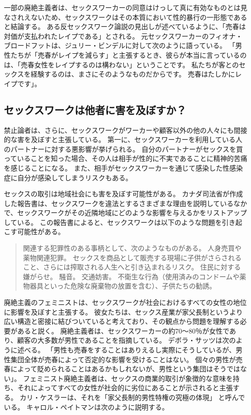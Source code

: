 \documentclass[paper=a4,book,openany]{jlreq} \usepackage{mystyle}
\begin{document}
一部の廃絶主義者は、セックスワーカーの同意はけっして真に有効なものとは見なされえないため、セックスワークはその本質において性的暴行の一形態であると結論する。
ある反セックスワーク論説の見出しが述べているように、「売春は対価が支払われたレイプである」とされる\citep{raymond95:_prost_is_rape_thats_paid}。
元セックスワーカーのフィオナ・ブロードフットは、ジュリー・ビンデルに対して次のように語っている。
「男性たちが「売春がレイプを減らす」と主張するとき、彼らが本当に言っているのは、「売春女性をレイプするのは構わない」ということです。
私たちが客とのセックスを経験するのは、まさにそのようなものだからです。
売春はたしかにレイプです」\citep{bindel19:_real_face_prost}。

\subsection{セックスワークは他者に害を及ぼすか？}

禁止論者は、さらに、セックスワークがワーカーや顧客以外の他の人々にも間接的な害を及ぼすと主張している。
第一に、セックスワーカーを利用している人のパートナーに対する悪影響が挙げられる。
自分のパートナーがセックスを買っていることを知った場合、その人は相手が性的に不実であることに精神的苦痛を感じることになる。
また、相手がセックスワーカーを通じて感染した性感染症に自分が感染してしまうリスクもある。

セックスの取引は地域社会にも害を及ぼす可能性がある。
カナダ司法省が作成した報告書は、セックスワークを違法とするさまざまな理由を説明しているなかで、セックスワークがその近隣地域にどのような影響を与えるかをリストアップしている。
この報告書によると、セックスワークは以下のような問題を引き起こす可能性がある。

\begin{quote}
関連する犯罪性のある事柄として、次のようなものがある。
人身売買や薬物関連犯罪。
セックスを商品として販売する現場に子供がさらされること、さらには搾取される人生へと引き込まれるリスク。
住民に対する嫌がらせ。
騒音。
交通妨害。
不衛生な行為（使用済みのコンドームや薬物器具といった危険な廃棄物の放置を含む）、子供たちの勧誘。
\citep{department14:_techn_paper}
\end{quote}

廃絶主義のフェミニストは、セックスワークが社会におけるすべての女性の地位に影響を及ぼすと主張する。
彼女たちは、セックス産業が家父長制というより広い構造と密接に結びついていると考えており、その観点から問題を理解する必要があると説く。
廃絶主義者は、セックスワーカーの約70～80％が女性であり、顧客の大多数が男性であることを指摘している。
デボラ・サッツは次のように述べる。
「男性も売春をすることはありえるし実際にそうしているが、男性集団全体が売春によって否定的な影響を受けることはない。
個々の男性が売春によって貶められることはあるかもしれないが、男性という集団はそうではない」\citep[p.149]{satz95:_market_women_sexual_labor}。
フェミニスト廃絶主義者は、セックスの商業的取引が象徴的な意味を持ち、それによってすべての女性が社会的に劣位にあることが示されると主張する。
カリ・ケスラーは、それを「家父長制的男性特権の究極の体現」 と呼んでいる\citep[p.19]{kesler02:_is_femin_stanc_suppor_prost_possib}。
キャロル・ペイトマンは次のように説明する。
\end{document}
